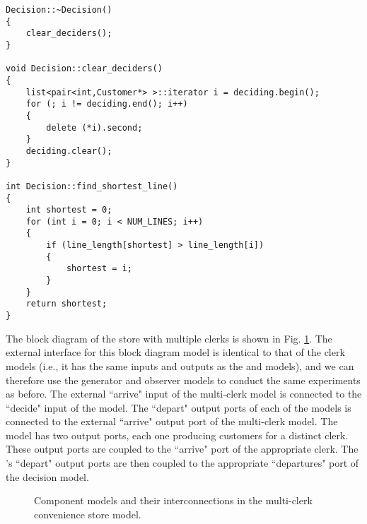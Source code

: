 \begin{verbatim}
Decision::~Decision()
{
    clear_deciders();
}

void Decision::clear_deciders()
{
    list<pair<int,Customer*> >::iterator i = deciding.begin();
    for (; i != deciding.end(); i++)
    {
        delete (*i).second;
    }
    deciding.clear();
}

int Decision::find_shortest_line()
{
    int shortest = 0;
    for (int i = 0; i < NUM_LINES; i++)
    {
        if (line_length[shortest] > line_length[i])
        {
            shortest = i;
        }
    }
    return shortest;
}
\end{verbatim}

The block diagram of the store with multiple clerks is shown in Fig. \ref{fig:multi_clerk_diagram}. The external interface for this block diagram model is identical to that of the clerk models (i.e., it has the same inputs and outputs as the  and  models), and we can therefore use the generator and observer models to conduct the same experiments as before. The external ``arrive" input of the multi-clerk model is connected to the ``decide" input of the  model. The ``depart" output ports of each of the  models is connected to the external ``arrive" output port of the multi-clerk model. The  model has two output ports, each one producing customers for a distinct clerk. These output ports are coupled to the ``arrive" port of the appropriate clerk. The 's ``depart" output ports are then coupled to the appropriate ``departures" port of the decision model.
\begin{figure}[ht]
\centering
{}
\caption{Component models and their interconnections in the multi-clerk convenience store model.}
\label{fig:multi_clerk_diagram}
\end{figure}    

